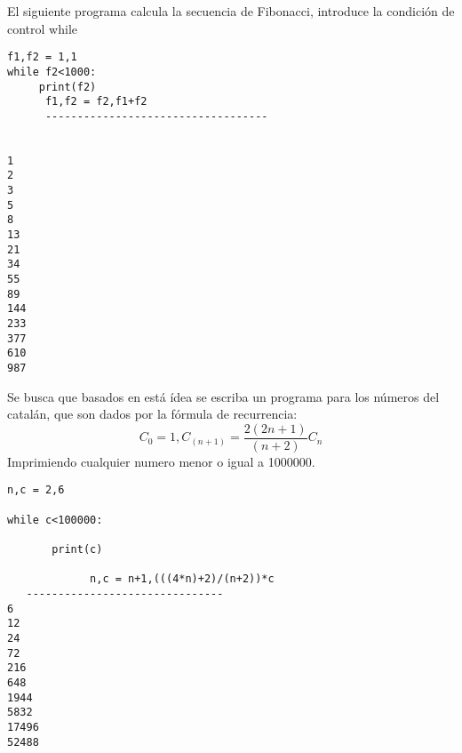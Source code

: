 \documentclass[12pt]{article}
\begin{document}
El siguiente programa calcula la secuencia de Fibonacci, introduce la condición de control while 

\begin{verbatim}
f1,f2 = 1,1
while f2<1000:
     print(f2)
      f1,f2 = f2,f1+f2
      -----------------------------------
       

1
2
3
5
8
13
21
34
55
89
144
233
377
610
987

\end{verbatim}
Se busca que basados en está ídea se escriba un programa para los números del catalán, que son dados por la fórmula de recurrencia:  
\begin{equation}
C_0=1, C_{(n+1)} = \frac{2(2n+1)}{(n+2)}C_n
\end{equation}
\newpage
Imprimiendo cualquier numero menor o igual a 1000000.

\begin{verbatim}
n,c = 2,6

while c<100000:

       print(c)
 
             n,c = n+1,(((4*n)+2)/(n+2))*c
   -------------------------------
6
12
24
72
216
648
1944
5832
17496
52488

\end{verbatim}
\end{document}
